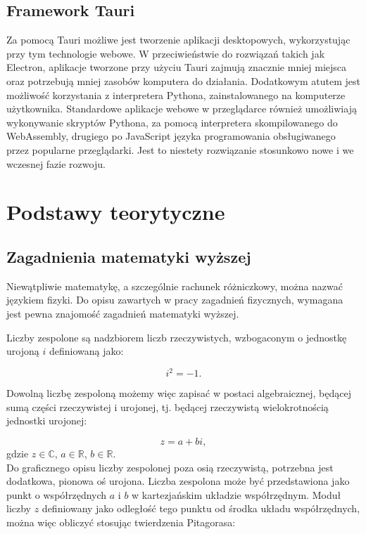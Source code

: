 \documentclass{SGGW-thesis}
\begin{document}
	\section{Framework Tauri}
	Za pomocą Tauri możliwe jest tworzenie aplikacji desktopowych, wykorzystując przy tym technologie webowe. W przeciwieństwie do rozwiązań takich jak Electron\cite{electron}, aplikacje tworzone przy użyciu Tauri zajmują znacznie mniej miejsca oraz potrzebują mniej zasobów komputera do działania. 
	Dodatkowym atutem jest możliwość korzystania z interpretera Pythona, zainstalowanego na komputerze użytkownika. Standardowe aplikacje webowe w przeglądarce również umożliwiają wykonywanie skryptów Pythona, za pomocą interpretera skompilowanego do WebAssembly\cite{WebAssembly Python}, drugiego po JavaScript języka programowania obsługiwanego przez popularne przeglądarki\cite{browser langs}. Jest to niestety rozwiązanie stosunkowo nowe i we wczesnej fazie rozwoju\cite{python-webassembly}.
	
\chapter{Podstawy teorytyczne}
	\section{Zagadnienia matematyki wyższej}
	Niewątpliwie matematykę, a szczególnie rachunek różniczkowy, można nazwać językiem fizyki. Do opisu zawartych w pracy zagadnień fizycznych, wymagana jest pewna znajomość zagadnień matematyki wyższej.

	Liczby zespolone są nadzbiorem liczb rzeczywistych, wzbogaconym o jednostkę urojoną $i$ \cite{liczby zespolone}definiowaną jako: 
	
	\begin{equation}
	i^2=-1.
	\end{equation}
	
	Dowolną liczbę zespoloną możemy więc zapisać w postaci algebraicznej, będącej sumą części rzeczywistej i urojonej, tj. będącej rzeczywistą wielokrotnością jednostki urojonej:
	
	\begin{equation}
	z = a+bi,
	\end{equation}
	gdzie
	$z \in \mathbb{C}$,
	$a \in \mathbb{R}$,
	$b \in \mathbb{R}$.\\
	
	Do graficznego opisu liczby zespolonej poza osią rzeczywistą, potrzebna jest dodatkowa, pionowa oś urojona. Liczba zespolona może być przedstawiona jako punkt o współrzędnych $a$ i $b$ w kartezjańskim układzie współrzędnym. Moduł liczby $z$ definiowany jako odległość tego punktu od środka układu współrzędnych, można więc obliczyć stosując twierdzenia Pitagorasa:
	
\end{document}
